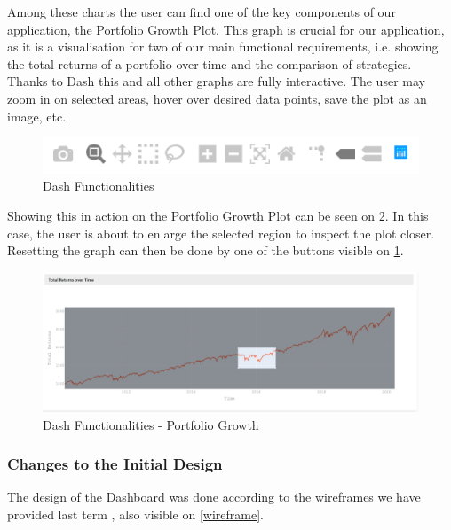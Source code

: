 \documentclass[main.tex]{subfiles}
\begin{document}
Among these charts the user can find one of the key components of our application, the Portfolio Growth Plot. This graph is crucial for our application, as it is a visualisation for two of our main functional requirements, i.e. showing the total returns of a portfolio over time and the comparison of strategies. 
Thanks to Dash this and all other graphs are fully interactive. The user may zoom in on selected areas, hover over desired data points, save the plot as an image, etc.

\begin{figure}[H]
   \centering
   \includegraphics[width=\textwidth]{08Appendices/081User/081Pictures/dash_funcionalities.png}
   \caption{Dash Functionalities}
   \label{dash_functionalities}
\end{figure}

Showing this in action on the Portfolio Growth Plot can be seen on \figurename{\ref{portfolio_growth}}. In this case, the user is about to enlarge the selected region to inspect the plot closer. Resetting the graph can then be done by one of the buttons visible on \figurename{\ref{dash_functionalities}}.

\begin{figure}[H]
   \centering
   \includegraphics[width=\textwidth]{04Design/04Pictures/portfolio_growth.png}
   \caption{Dash Functionalities - Portfolio Growth}
   \label{portfolio_growth}
\end{figure}

\subsubsection{Changes to the Initial Design}

The design of the Dashboard was done according to the wireframes we have provided last term \cite{TR}, also visible on \figurename{\ref{wireframe}}.
\end{document}
